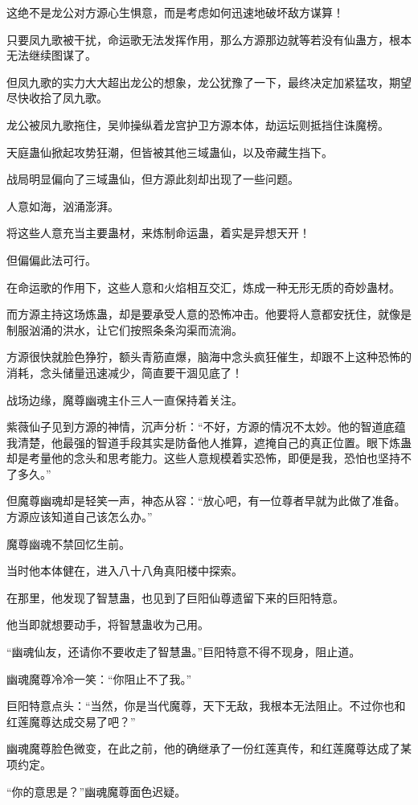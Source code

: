 \begin{this_body}
这绝不是龙公对方源心生惧意，而是考虑如何迅速地破坏敌方谋算！

只要凤九歌被干扰，命运歌无法发挥作用，那么方源那边就等若没有仙蛊方，根本无法继续图谋了。

但凤九歌的实力大大超出龙公的想象，龙公犹豫了一下，最终决定加紧猛攻，期望尽快收拾了凤九歌。

龙公被凤九歌拖住，吴帅操纵着龙宫护卫方源本体，劫运坛则抵挡住诛魔榜。

天庭蛊仙掀起攻势狂潮，但皆被其他三域蛊仙，以及帝藏生挡下。

战局明显偏向了三域蛊仙，但方源此刻却出现了一些问题。

人意如海，汹涌澎湃。

将这些人意充当主要蛊材，来炼制命运蛊，着实是异想天开！

但偏偏此法可行。

在命运歌的作用下，这些人意和火焰相互交汇，炼成一种无形无质的奇妙蛊材。

而方源主持这场炼蛊，却是要承受人意的恐怖冲击。他要将人意都安抚住，就像是制服汹涌的洪水，让它们按照条条沟渠而流淌。

方源很快就脸色狰狞，额头青筋直爆，脑海中念头疯狂催生，却跟不上这种恐怖的消耗，念头储量迅速减少，简直要干涸见底了！

战场边缘，魔尊幽魂主仆三人一直保持着关注。

紫薇仙子见到方源的神情，沉声分析：“不好，方源的情况不太妙。他的智道底蕴我清楚，他最强的智道手段其实是防备他人推算，遮掩自己的真正位置。眼下炼蛊却是考量他的念头和思考能力。这些人意规模着实恐怖，即便是我，恐怕也坚持不了多久。”

但魔尊幽魂却是轻笑一声，神态从容：“放心吧，有一位尊者早就为此做了准备。方源应该知道自己该怎么办。”

魔尊幽魂不禁回忆生前。

当时他本体健在，进入八十八角真阳楼中探索。

在那里，他发现了智慧蛊，也见到了巨阳仙尊遗留下来的巨阳特意。

他当即就想要动手，将智慧蛊收为己用。

“幽魂仙友，还请你不要收走了智慧蛊。”巨阳特意不得不现身，阻止道。

幽魂魔尊冷冷一笑：“你阻止不了我。”

巨阳特意点头：“当然，你是当代魔尊，天下无敌，我根本无法阻止。不过你也和红莲魔尊达成交易了吧？”

幽魂魔尊脸色微变，在此之前，他的确继承了一份红莲真传，和红莲魔尊达成了某项约定。

“你的意思是？”幽魂魔尊面色迟疑。


\end{this_body}

